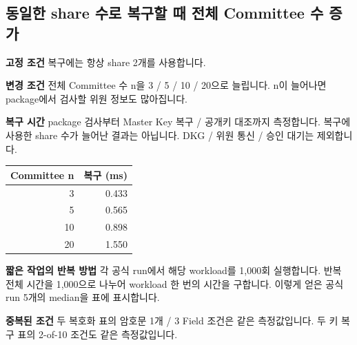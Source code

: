 \documentclass[11pt,a4paper]{article}
\begin{document}
\par\noindent\begin{minipage}{\linewidth}
\subsection*{동일한 share 수로 복구할 때 전체 Committee 수 증가}
\textbf{고정 조건}\newline
복구에는 항상 share 2개를 사용합니다.\par\smallskip
\textbf{변경 조건}\newline
전체 Committee 수 n을 3 / 5 / 10 / 20으로 늘립니다.\newline
n이 늘어나면 package에서 검사할 위원 정보도 많아집니다.\par\smallskip
\textbf{복구 시간}\newline
package 검사부터 Master Key 복구 / 공개키 대조까지 측정합니다.\newline
복구에 사용한 share 수가 늘어난 결과는 아닙니다.\newline
DKG / 위원 통신 / 승인 대기는 제외합니다.\par\smallskip
\begin{center}\small\begin{tabular}{@{}rr@{}}\toprule
\textbf{Committee n} & \textbf{복구 (ms)} \\
\midrule
3 & 0.433 \\
5 & 0.565 \\
10 & 0.898 \\
20 & 1.550 \\
\bottomrule\end{tabular}\end{center}
\end{minipage}\par\medskip
\textbf{짧은 작업의 반복 방법}\newline
각 공식 run에서 해당 workload를 1,000회 실행합니다.\newline
반복 전체 시간을 1,000으로 나누어 workload 한 번의 시간을 구합니다.\newline
이렇게 얻은 공식 run 5개의 median을 표에 표시합니다.\par\smallskip
\textbf{중복된 조건}\newline
두 복호화 표의 암호문 1개 / 3 Field 조건은 같은 측정값입니다.\newline
두 키 복구 표의 2-of-10 조건도 같은 측정값입니다.
\end{document}
